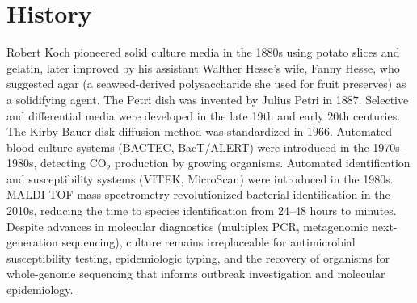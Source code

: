 \section*{History}
Robert Koch pioneered solid culture media in the 1880s using potato slices and gelatin, later improved by his assistant Walther Hesse's wife, Fanny Hesse, who suggested agar (a seaweed-derived polysaccharide she used for fruit preserves) as a solidifying agent. The Petri dish was invented by Julius Petri in 1887. Selective and differential media were developed in the late 19th and early 20th centuries. The Kirby-Bauer disk diffusion method was standardized in 1966. Automated blood culture systems (BACTEC, BacT/ALERT) were introduced in the 1970s--1980s, detecting CO$_2$ production by growing organisms. Automated identification and susceptibility systems (VITEK, MicroScan) were introduced in the 1980s. MALDI-TOF mass spectrometry revolutionized bacterial identification in the 2010s, reducing the time to species identification from 24--48 hours to minutes. Despite advances in molecular diagnostics (multiplex PCR, metagenomic next-generation sequencing), culture remains irreplaceable for antimicrobial susceptibility testing, epidemiologic typing, and the recovery of organisms for whole-genome sequencing that informs outbreak investigation and molecular epidemiology.

